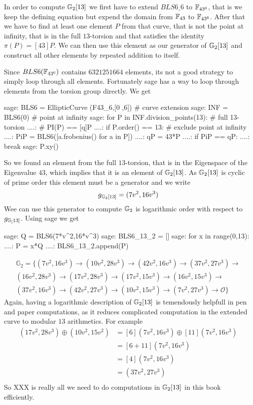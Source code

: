In order to compute $\mathbb{G}_2[13]$ we first have to extend $BLS6\_6$ to $\mathbb{F}_{43^6}$, that is we keep the defining equation but expend the domain from $\mathbb{F}_{43}$ to $\mathbb{F}_{43^6}$. After that we have to find at least one element $P$ from that curve, that is not the point at infinity, that is in the full $13$-torsion and that satisfies the identity $\pi(P) = [43]P$. We can then use this element as our generator of $\mathbb{G}_2[13]$ and construct all other elements by repeated addition to itself.

Since $BLS6(\mathbb{F}_{43^6})$ contains $6321251664$ elements, its not a good strategy to simply loop through all elements. Fortunately sage has a way to loop through elements from the torsion group directly. We get
\begin{sagecommandline}
sage: BLS6 = EllipticCurve (F43_6,[0 ,6]) # curve extension
sage: INF = BLS6(0) # point at infinity
sage: for P in INF.division_points(13): # full 13-torsion
....: # PI(P) == [q]P
....:     if P.order() == 13: # exclude point at infinity
....:         PiP = BLS6([a.frobenius() for a in P])
....:         qP = 43*P
....:         if PiP == qP:
....:             break
sage: P.xy()
\end{sagecommandline}
So we found an element from the full $13$-torsion, that is in the Eigenspace of the Eigenvalue $43$, which implies that it is an element of $\mathbb{G}_2[13]$. As $\mathbb{G}_2[13]$ is cyclic of prime order this element must be a generator and we write
\begin{equation}
g_{\mathbb{G}_2[13]} = (7v^2, 16v^3)
\end{equation}
Wee can use this generator to compute $\mathbb{G}_2$ is logarithmic order with respect to $g_{\mathbb{G}_[13]}$. Using sage we get
\begin{sagecommandline}
sage: Q = BLS6(7*v^2,16*v^3)
sage: BLS6_13_2 = []
sage: for x in range(0,13):
....:     P = x*Q
....:     BLS6_13_2.append(P)
\end{sagecommandline}
\begin{multline*}
\mathbb{G}_2=\{
(7v^2, 16v^3) \to
(10v^2, 28v^3)\to
(42v^2, 16v^3)\to
(37v^2, 27v^3)\to\\
(16v^2, 28v^3)\to
(17v^2, 28v^3)\to
(17v^2, 15v^3)\to
(16v^2, 15v^3)\to\\
(37v^2, 16v^3)\to
(42v^2, 27v^3)\to
(10v^2, 15v^3)\to
(7v^2, 27v^3)\to
\mathcal{O}\}
\end{multline*}
Again, having a logarithmic description of $\mathbb{G}_2[13]$ is temendously helpfull in pen and paper computations, as it reduces complicated computation in the extended curve to modular $13$ arithmetics. For example
\begin{align*}
(17v^2,28v^3)\oplus (10v^2,15v^2)  & = [6](7v^2,16v^3)\oplus [11](7v^2,16v^3)\\
                      & = [6+11](7v^2,16v^3)\\
                      & = [4](7v^2,16v^3)\\
                      & = (37v^2,27v^3)\\
\end{align*}
So XXX is really all we need to do computations in $\mathbb{G}_2[13]$ in this book efficiently.

